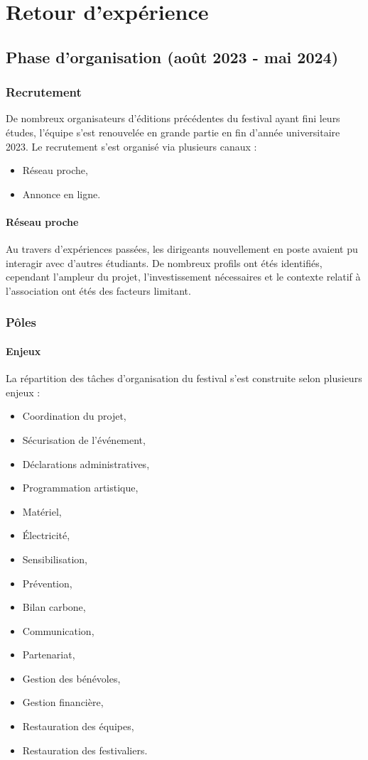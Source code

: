 \documentclass[12pt,a4paper]{report}
\begin{document}
\chapter{Retour d'expérience}

\section{Phase d'organisation (août 2023 - mai 2024)}
\subsection{Recrutement}
De nombreux organisateurs d'éditions précédentes du festival ayant fini leurs études, l'équipe  s'est renouvelée en grande partie en fin d'année universitaire 2023.
Le recrutement s'est organisé via plusieurs canaux : 
\begin{itemize}
\item Réseau proche,
\item Annonce en ligne.
\end{itemize}

\subsubsection{Réseau proche}
Au travers d'expériences passées, les dirigeants nouvellement en poste avaient pu interagir avec d'autres étudiants. De nombreux profils ont étés identifiés, cependant l'ampleur du projet, l'investissement nécessaires et le contexte relatif à l'association ont étés des facteurs limitant.

\subsection{Pôles}
\subsubsection{Enjeux}
La répartition des tâches d'organisation du festival s'est construite selon plusieurs enjeux :
\begin{itemize}
\item Coordination du projet,
\item Sécurisation de l'événement,
\item Déclarations administratives,
\item Programmation artistique,
\item Matériel,
\item Électricité,
\item Sensibilisation,
\item Prévention,
\item Bilan carbone,
\item Communication,
\item Partenariat,
\item Gestion des bénévoles,
\item Gestion financière,
\item Restauration des équipes,
\item Restauration des festivaliers. \\
\end{itemize}
\end{document}
